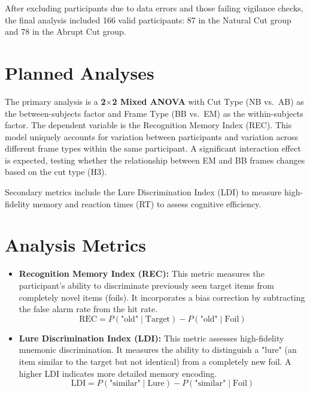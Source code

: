 \documentclass[11pt, a4paper]{article}
\begin{document}
After excluding participants due to data errors and those failing vigilance checks, the final analysis included 166 valid participants: 87 in the Natural Cut group and 78 in the Abrupt Cut group.

\section{Planned Analyses}

The primary analysis is a \textbf{2$\times$2 Mixed ANOVA} with Cut Type (NB vs.\ AB) as the between-subjects factor and Frame Type (BB vs.\ EM) as the within-subjects factor. The dependent variable is the Recognition Memory Index (REC). This model uniquely accounts for variation between participants and variation across different frame types within the same participant. A significant interaction effect is expected, testing whether the relationship between EM and BB frames changes based on the cut type (H3).

Secondary metrics include the Lure Discrimination Index (LDI) to measure high-fidelity memory and reaction times (RT) to assess cognitive efficiency.

\section{Analysis Metrics}

\begin{itemize}
    \item \textbf{Recognition Memory Index (REC):} This metric measures the participant's ability to discriminate previously seen target items from completely novel items (foils). It incorporates a bias correction by subtracting the false alarm rate from the hit rate.
    \[
    \text{REC} = P(\text{"old"} \mid \text{Target}) - P(\text{"old"} \mid \text{Foil})
    \]

    \item \textbf{Lure Discrimination Index (LDI):} This metric assesses high-fidelity mnemonic discrimination. It measures the ability to distinguish a "lure" (an item similar to the target but not identical) from a completely new foil. A higher LDI indicates more detailed memory encoding.
    \[
    \text{LDI} = P(\text{"similar"} \mid \text{Lure}) - P(\text{"similar"} \mid \text{Foil})
    \]
\end{itemize}
\end{document}
